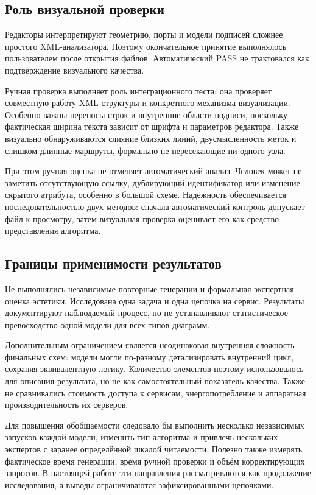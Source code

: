 \documentclass[a4paper,12pt]{extreport}
\begin{document}
\subsection{Роль визуальной проверки}

Редакторы интерпретируют геометрию, порты и модели подписей сложнее простого XML-анализатора. Поэтому окончательное принятие выполнялось пользователем после открытия файлов. Автоматический PASS не трактовался как подтверждение визуального качества.

Ручная проверка выполняет роль интеграционного теста: она проверяет совместную работу XML-структуры и конкретного механизма визуализации. Особенно важны переносы строк и внутренние области подписи, поскольку фактическая ширина текста зависит от шрифта и параметров редактора. Также визуально обнаруживаются слияние близких линий, двусмысленность меток и слишком длинные маршруты, формально не пересекающие ни одного узла.

При этом ручная оценка не отменяет автоматический анализ. Человек может не заметить отсутствующую ссылку, дублирующий идентификатор или изменение скрытого атрибута, особенно в большой схеме. Надёжность обеспечивается последовательностью двух методов: сначала автоматический контроль допускает файл к просмотру, затем визуальная проверка оценивает его как средство представления алгоритма.

\subsection{Границы применимости результатов}

Не выполнялись независимые повторные генерации и формальная экспертная оценка эстетики. Исследована одна задача и одна цепочка на сервис. Результаты документируют наблюдаемый процесс, но не устанавливают статистическое превосходство одной модели для всех типов диаграмм.

Дополнительным ограничением является неодинаковая внутренняя сложность финальных схем: модели могли по-разному детализировать внутренний цикл, сохраняя эквивалентную логику. Количество элементов поэтому использовалось для описания результата, но не как самостоятельный показатель качества. Также не сравнивались стоимость доступа к сервисам, энергопотребление и аппаратная производительность их серверов.

Для повышения обобщаемости следовало бы выполнить несколько независимых запусков каждой модели, изменить тип алгоритма и привлечь нескольких экспертов с заранее определённой шкалой читаемости. Полезно также измерять фактическое время генерации, время ручной проверки и объём корректирующих запросов. В настоящей работе эти направления рассматриваются как продолжение исследования, а выводы ограничиваются зафиксированными цепочками.
\end{document}
